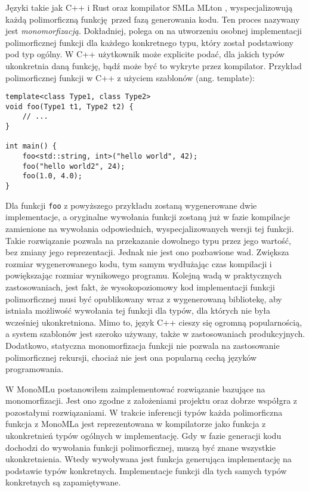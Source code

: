 \documentclass[declaration,shortabstract]{iithesis}
\begin{document}
Języki takie jak C++ i Rust \cite{levity_polymorphism} oraz kompilator SMLa 
MLton \cite{mono_mlton}, wyspecjalizowują każdą polimorficzną funkcję przed 
fazą generowania 
kodu. Ten proces nazywany jest \textit{monomorfizacją}. Dokładniej, polega on na 
utworzeniu osobnej 
implementacji polimorficznej funkcji dla każdego konkretnego typu, który 
został 
podstawiony pod typ ogólny. W C++ użytkownik może explicite podać,
dla jakich typów ukonkretnia daną funkcję, bądź może być to wykryte przez 
kompilator. 
Przykład polimorficznej funkcji w 
C++ z użyciem szablonów (ang. template):

\begin{lstlisting}[frame=lines]
template<class Type1, class Type2>
void foo(Type1 t1, Type2 t2) {
    // ...
}

int main() {
    foo<std::string, int>("hello world", 42);
    foo("hello world2", 24);
    foo(1.0, 4.0);
}
\end{lstlisting}

Dla funkcji \texttt{foo} z powyższego przykładu zostaną wygenerowane dwie 
implementacje, a oryginalne wywołania funkcji zostaną już w fazie kompilacje
zamienione na wywołania odpowiednich, wyspecjalizowanych wersji tej funkcji.
Takie rozwiązanie pozwala na przekazanie dowolnego typu przez jego wartość, 
bez zmiany jego reprezentacji. Jednak nie jest ono pozbawione wad. 
Zwiększa rozmiar wygenerowanego kodu, tym samym 
wydłużając czas kompilacji i powiększając rozmiar wynikowego programu. Kolejną 
wadą w praktycznych zastosowaniach, jest fakt, że wysokopoziomowy kod 
implementacji funkcji polimorficznej musi być opublikowany wraz z wygenerowaną 
bibliotekę, aby istniała możliwość wywołania tej funkcji dla typów, dla 
których nie była wcześniej ukonkretniona. Mimo to, język C++ cieszy 
się ogromną popularnością, a system szablonów jest szeroko używany, także w 
zastosowaniach produkcyjnych. Dodatkowo, statyczna monomorfizacja funkcji 
nie pozwala na zastosowanie polimorficznej rekursji, chociaż 
nie jest ona popularną cechą języków programowania.

W MonoMLu postanowiłem zaimplementować rozwiązanie bazujące na 
monomorfizacji. Jest ono zgodne z założeniami projektu oraz dobrze współgra z 
pozostałymi rozwiązaniami. W trakcie inferencji typów każda polimorficzna 
funkcja z MonoMLa jest reprezentowana w kompilatorze jako funkcja z 
ukonkretnień typów ogólnych w implementację. Gdy w fazie generacji kodu 
dochodzi do wywołania funkcji polimorficznej, muszą być znane wszystkie 
ukonkretnienia. Wtedy wywoływana jest funkcja generująca implementację na 
podstawie typów konkretnych. Implementacje funkcji dla tych samych typów 
konkretnych są zapamiętywane.
\end{document}
